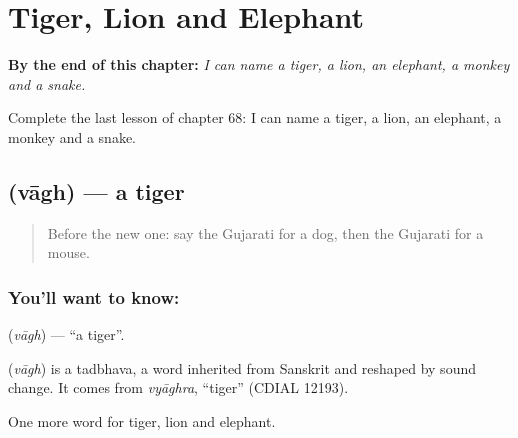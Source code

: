 
\chapter{Tiger, Lion and Elephant}
\label{ch:gu-tiger-lion-and-elephant}

\begin{chapteropening}
\textbf{By the end of this chapter:} \emph{I can name a tiger, a lion, an elephant, a monkey and a snake.}

Complete the last lesson of chapter 68: I can name a tiger, a lion, an elephant, a monkey and a snake.
\end{chapteropening}

\section[\texorpdfstring{\gu{વાઘ} (vāgh)}{વાઘ (vāgh)}]{ (vāgh) — a tiger}

\label{lesson:GU-C68-tiger}



\begin{quote}
Before the new one: say the Gujarati for a dog, then the Gujarati for a mouse.
\end{quote}

\subsection*{You'll want to know: }
\textbf{} (\emph{vāgh}) — \textquotedblleft{}a tiger\textquotedblright{}.

\begin{cousinweb}
\textbf{} (\emph{vāgh}) is a tadbhava, a word inherited from Sanskrit and reshaped by sound change. It comes from \emph{vyāghra}, \textquotedblleft{}tiger\textquotedblright{} (CDIAL 12193).
\end{cousinweb}

\begin{grammarlens}[title={What you've built}]
One more word for tiger, lion and elephant.
\end{grammarlens}

